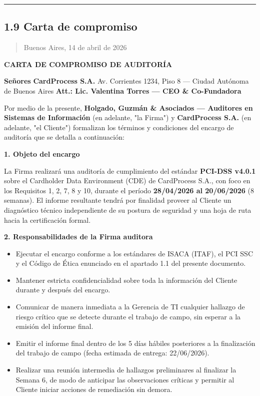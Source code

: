 \documentclass[11pt,a4paper]{article}
\begin{document}
\noindent\rule{\linewidth}{0.4pt}

\subsection{1.9 Carta de compromiso}

\vspace{0.5em}

\begin{quote}
Buenos Aires, 14 de abril de 2026
\end{quote}

\textbf{CARTA DE COMPROMISO DE AUDITORÍA}

\textbf{Señores}
\textbf{CardProcess S.A.}
Av. Corrientes 1234, Piso 8 — Ciudad Autónoma de Buenos Aires
\textbf{Att.: Lic. Valentina Torres — CEO \& Co-Fundadora}

\vspace{0.5em}

Por medio de la presente, \textbf{Holgado, Guzmán \& Asociados — Auditores en Sistemas de Información} (en adelante, "la Firma") y \textbf{CardProcess S.A.} (en adelante, "el Cliente") formalizan los términos y condiciones del encargo de auditoría que se detalla a continuación:

\textbf{1. Objeto del encargo}

La Firma realizará una auditoría de cumplimiento del estándar \textbf{PCI-DSS v4.0.1} sobre el Cardholder Data Environment (CDE) de CardProcess S.A., con foco en los Requisitos 1, 2, 7, 8 y 10, durante el período \textbf{28/04/2026 al 20/06/2026} (8 semanas). El informe resultante tendrá por finalidad proveer al Cliente un diagnóstico técnico independiente de su postura de seguridad y una hoja de ruta hacia la certificación formal.

\textbf{2. Responsabilidades de la Firma auditora}

\begin{itemize}[leftmargin=*]
  \item Ejecutar el encargo conforme a los estándares de ISACA (ITAF), el PCI SSC y el Código de Ética enunciado en el apartado 1.1 del presente documento.
  \item Mantener estricta confidencialidad sobre toda la información del Cliente durante y después del encargo.
  \item Comunicar de manera inmediata a la Gerencia de TI cualquier hallazgo de riesgo crítico que se detecte durante el trabajo de campo, sin esperar a la emisión del informe final.
  \item Emitir el informe final dentro de los 5 días hábiles posteriores a la finalización del trabajo de campo (fecha estimada de entrega: 22/06/2026).
  \item Realizar una reunión intermedia de hallazgos preliminares al finalizar la Semana 6, de modo de anticipar las observaciones críticas y permitir al Cliente iniciar acciones de remediación sin demora.
\end{itemize}
\end{document}
